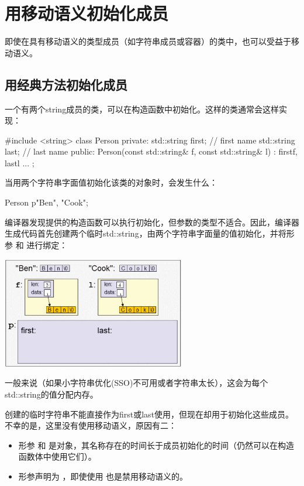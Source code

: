 \section{用移动语义初始化成员}
即使在具有移动语义的类型成员（如字符串成员或容器）的类中，也可以受益于移动语义。

\subsection{用经典方法初始化成员}

一个有两个string成员的类，可以在构造函数中初始化。这样的类通常会这样实现：

\begin{cppcode}
#include <string>
class Person {
private:
	std::string first; // first name
	std::string last; // last name
public:
	Person(const std::string& f, const std::string& l)
	: first{f}, last{l} {
	}
	...
};
\end{cppcode}

当用两个字符串字面值初始化该类的对象时，会发生什么：

\begin{cppcode}
Person p{"Ben", "Cook"};
\end{cppcode}

编译器发现提供的构造函数可以执行初始化，但参数的类型不适合。因此，编译器生成代码首先创建两个临时std::string，由两个字符串字面量的值初始化，并将形参  和  进行绑定：

\begin{center}
	\includegraphics[width=0.6\textwidth]{part1/ch4/images/1}
\end{center}

一般来说（如果小字符串优化(SSO)不可用或者字符串太长），这会为每个std::string的值分配内存。

创建的临时字符串不能直接作为first或last使用，但现在却用于初始化这些成员。不幸的是，这里没有使用移动语义，原因有二：

\begin{itemize}
	\item 形参  和  是对象，其名称存在的时间长于成员初始化的时间（仍然可以在构造函数体中使用它们）。
	\item 形参声明为 ，即使使用  也是禁用移动语义的。
\end{itemize}

